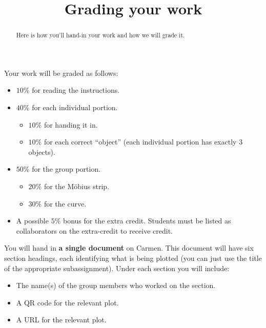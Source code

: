 \documentclass[noauthor,nooutcomes]{ximera}
\title{Grading your work}
\begin{document}
\begin{abstract}
  Here is how you'll hand-in your work and how we will grade it.
\end{abstract}
\maketitle

Your work will be graded as follows:

\begin{itemize}
\item $10\%$ for reading the instructions.
\item $40\%$ for each individual portion.
  \begin{itemize}
  \item $10\%$ for handing it in.
  \item $10\%$ for each correct ``object'' (each individual portion has exactly $3$ objects).
  \end{itemize}
\item $50\%$ for the group portion.
  \begin{itemize}
  \item $20\%$ for the M\"obius strip. 
  \item $30\%$ for the curve.
  \end{itemize}
\item A possible $5\%$ bonus for the extra credit. Students must be
  listed as collaborators on the extra-credit to receive credit.
\end{itemize}

You will hand in \textbf{a single document} on Carmen. This document
will have six section headings, each identifying what is being plotted
(you can just use the title of the appropriate subassignment).  Under
each section you will include:
\begin{itemize}
\item The name(s) of the group members who worked on the section.
\item A QR code for the relevant plot.
\item A URL for the relevant plot.
\end{itemize}
\end{document}
